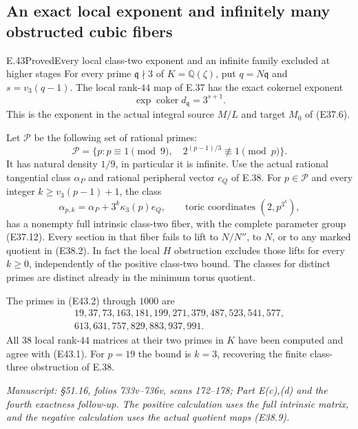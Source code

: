 \subsection{An exact local exponent and infinitely many obstructed cubic fibers}

\begin{statement}{E.43}{Proved}{Every local class-two exponent and an infinite family excluded at higher stages}
For every prime $\mathfrak q\nmid3$ of
$K=\mathbb Q(\zeta)$, put $q=N\mathfrak q$ and
$s=v_3(q-1)$. The local rank-$44$ map of E.37 has
the exact cokernel exponent
\[
       \exp\operatorname{coker}d_{\mathfrak q}=3^{s+1}.
 \tag{E43.1}
\]
This is the exponent in the actual integral source
$M/L$ and target $M_0$ of (E37.6).

Let $\mathcal P$ be the following set of rational primes:
\[
 \mathcal P=\{p:p\equiv1\pmod9,\quad
                         2^{(p-1)/3}\not\equiv1\pmod p\}.
 \tag{E43.2}
\]
It has natural density $1/9$, in particular it is
infinite. Use the actual rational tangential class
$\alpha_P$ and rational peripheral vector $e_Q$
of E.38. For $p\in\mathcal P$ and every integer
$k\ge v_3(p-1)+1$, the class
\[
 \alpha_{p,k}=\alpha_P+3^k\kappa_3(p)e_Q,
       \qquad\text{toric coordinates }(2,p^{3^k}),
 \tag{E43.3}
\]
has a nonempty full intrinsic class-two fiber, with
the complete parameter group (E37.12). Every section
in that fiber fails to lift to $N/N''$, to $N$,
or to any marked quotient in (E38.2). In fact the
local $H$ obstruction excludes those lifts for
every $k\ge0$, independently of the positive
class-two bound. The classes for distinct primes
are distinct already in the minimum torus quotient.

The primes in (E43.2) through $1000$ are
\[
\begin{gathered}
19,37,73,163,181,199,271,379,487,523,541,577,\\
613,631,757,829,883,937,991.
\end{gathered}
\tag{E43.4}
\]
All $38$ local rank-$44$ matrices at their two
primes in $K$ have been computed and agree with
(E43.1). For $p=19$ the bound is $k=3$, recovering
the finite class-three obstruction of E.38.

\emph{Manuscript: \S51.16, folios 733v--736v, scans 172--178;
Part E(c),(d) and the fourth exactness follow-up.
The positive calculation uses the full intrinsic
matrix, and the negative calculation uses the
actual quotient maps (E38.9).}
\end{statement}
